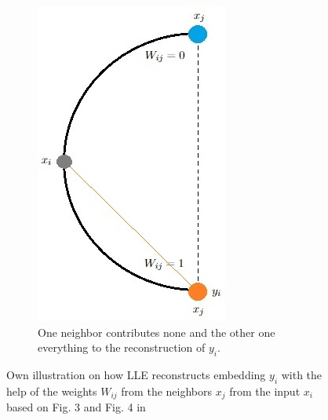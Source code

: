 \begin{figure}[!]
\begin{subfigure}[t]{0.40\textwidth}
         \includegraphics[width=\textwidth]{images/lle_1_0.jpg}
         \caption{One neighbor contributes none and the other one everything to the reconstruction of \textcolor{embedding}{$y_i$}.}
         \label{subfig:lle_1_0}
     \end{subfigure}
        \caption[How LLE reconstructs embeddings]{Own illustration on how LLE reconstructs embedding \textcolor{embedding}{$y_i$} with the help of the weights $W_{ij}$ from the neighbors \textcolor{neighbor}{$x_j$} from the input \textcolor{input}{$x_i$} based on Fig. 3 and Fig. 4 in \cite{saul03}}
        \label{fig:lle_illustration}
\end{figure}

